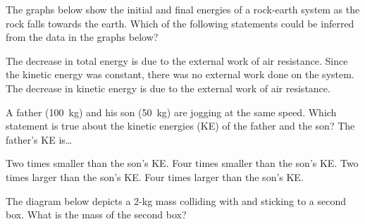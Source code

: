 \documentclass[]{exam}
\begin{document}
\begin{questions}
\question
The graphs below show the initial and final energies of a rock-earth system as the rock falls towards the earth. Which of the following statements could be inferred from the data in the graphs below?

\begin{center}
    \hspace{1cm}
\end{center}

\begin{randomizechoices}
    \correctchoice The decrease in total energy is due to the external work of air resistance.
    \choice Since the kinetic energy was constant, there was no external work done on the system.
    \choice The decrease in kinetic energy is due to the external work of air resistance.
\end{randomizechoices}


\question
A father (\SI{100}{kg}) and his son (\SI{50}{kg}) are jogging at the same speed. Which statement is true about the kinetic energies (KE) of the father and the son? The father's KE is\dots

\begin{randomizechoices}
    \choice Two times smaller than the son's KE.
    \choice Four times smaller than the son's KE.
    \correctchoice Two times larger than the son's KE.
    \choice Four times larger than the son's KE.
\end{randomizechoices}

\question
The diagram below depicts a 2-kg mass colliding with and sticking to a second box. What is the mass of the second box?


\end{questions}
\end{document}
